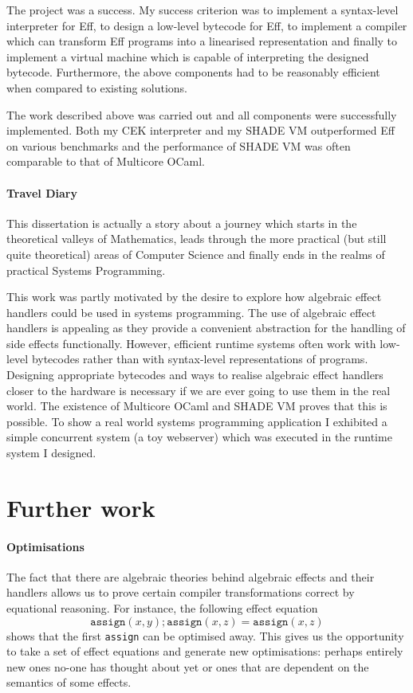 \documentclass[class=article, crop=false]{standalone}
\begin{document}
The project was a success. My success criterion was to implement a 
syntax-level interpreter for Eff, to design a low-level bytecode for Eff,
to implement a compiler which can transform Eff programs into a linearised
representation and finally to implement a virtual machine which is capable of
interpreting the designed bytecode. Furthermore, the above components had to be
reasonably efficient when compared to existing solutions.

The work described above was carried out and all components were successfully
implemented. Both my CEK interpreter and my SHADE VM outperformed Eff on various
benchmarks and the performance of SHADE VM was often comparable to that of
Multicore OCaml.

\paragraph{Travel Diary}

This dissertation is actually a story about a journey
which starts in the theoretical valleys of Mathematics, leads through the more
practical (but still quite theoretical) areas of Computer Science and finally
ends in the realms of practical Systems Programming.

This work was partly motivated by the desire to explore how algebraic effect
handlers could be used in systems programming. The use of algebraic effect
handlers is appealing as they provide a convenient abstraction for the handling
of side effects functionally. However, efficient runtime systems often work
with low-level bytecodes rather than with syntax-level representations of
programs. Designing appropriate bytecodes and ways to realise algebraic effect
handlers closer to the hardware is necessary if we are ever
going to use them in the real world. The existence of Multicore OCaml and SHADE VM
proves that this is possible. To show a real world systems programming application
I exhibited a simple concurrent system (a toy webserver) which was executed
in the runtime system I designed. 

\section{Further work}

\paragraph{Optimisations}
The fact that there are algebraic theories behind algebraic effects and their
handlers allows us to prove certain compiler transformations correct by
equational reasoning. For instance, the following effect equation
$$\mathtt{assign}(x,y); \mathtt{assign}(x,z) = \mathtt{assign}(x, z)$$
shows that the first \texttt{assign} can be optimised away.
This gives us the opportunity to take a set of effect
equations and generate new optimisations: perhaps entirely new ones no-one has
thought about yet or ones that are dependent on the semantics of some effects.
\end{document}
